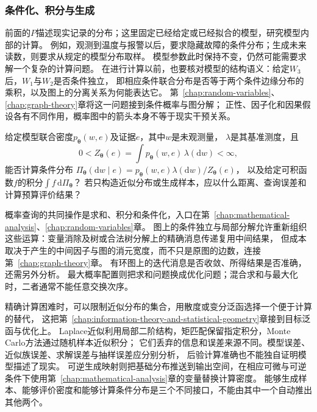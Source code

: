 \subsubsection{条件化、积分与生成}
\label{sec:future-analysis-probabilistic-query}

前面的$P$描述现实记录的分布；这里固定已经给定或已经拟合的模型，研究模型内部的计算。
例如，观测到温度与报警以后，要求隐藏故障的条件分布；生成未来读数，则要求从规定的模型分布取样。
模型参数此时保持不变，仍然可能需要求解一个复杂的计算问题。
在进行计算以前，也要核对模型的结构语义：给定$W_3$后，$W_1$与$W_2$是否条件独立，
即相应条件联合分布是否等于两个条件边缘分布的乘积，以及图上的分离关系为何能表达它。
第~\ref{chap:random-variables}、\ref{chap:graph-theory}章将这一问题接到条件概率与图分解；
正性、因子化和因果假设各有不同作用，概率图中的箭头本身不等于现实干预关系。

\begin{mathproblem}
  \label{question:future-probabilistic-query}
  给定模型联合密度$p_{\bm\theta}(w,e)$及证据$e$，其中$w$是未观测量，
  $\lambda$是其基准测度，且
  \[
    0<Z_{\bm\theta}(e)=\int p_{\bm\theta}(w,e)\,\lambda(\mathrm dw)<\infty,
  \]
  能否计算条件分布
  $\Pi_{\bm\theta}(\mathrm dw\mid e)=p_{\bm\theta}(w,e)\lambda(\mathrm dw)/Z_{\bm\theta}(e)$，
  以及给定可积函数$f$的积分$\int f\,\mathrm d\Pi_{\bm\theta}$？
  若只构造近似分布或生成样本，应以什么距离、查询误差和计算预算评价结果？
\end{mathproblem}

概率查询的共同操作是求和、积分和条件化，入口在第~\ref{chap:mathematical-analysis}、\ref{chap:random-variables}章。
图上的条件独立与局部分解允许重新组织这些运算：变量消除及树或合法树分解上的精确消息传递复用中间结果，
但成本取决于产生的中间因子与图的消元宽度，而不只是原图的边数，连接第~\ref{chap:graph-theory}章。
有环图上的迭代消息是否收敛、所得结果是否准确，还需另外分析。
最大概率配置则把求和问题换成优化问题；混合求和与最大化时，二者通常不能任意交换次序。

精确计算困难时，可以限制近似分布的集合，用散度或变分泛函选择一个便于计算的替代，
这把第~\ref{chap:information-theory-and-statistical-geometry}章接到目标泛函与优化上。
Laplace近似利用局部二阶结构，矩匹配保留指定积分，Monte Carlo方法通过随机样本近似积分；
它们丢弃的信息和误差来源不同。模型误差、近似族误差、求解误差与抽样误差应分别分析，
后验计算准确也不能独自证明模型描述了现实。
可逆生成映射则把基础分布推送到输出空间，在相应可微与可逆条件下使用第~\ref{chap:mathematical-analysis}章的变量替换计算密度。
能够生成样本、能够评价密度和能够计算条件分布是三个不同接口，不能由其中一个自动推出其他两个。

